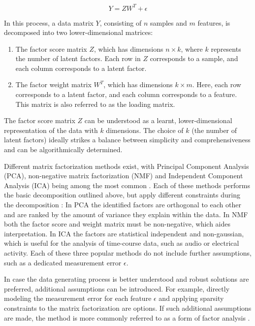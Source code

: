 \begin{flushleft}
\begin{equation}
    Y = ZW^T + \epsilon
\end{equation}

In this process, a data matrix \( Y \), consisting of \( n \) samples and \( m \) features, is decomposed into two lower-dimensional matrices: 

\begin{enumerate}
    \item The factor score matrix \( Z \), which has dimensions \( n \times k \), where \( k \) represents the number of latent factors. Each row in \( Z \) corresponds to a sample, and each column corresponds to a latent factor.
    \item The factor weight matrix \( W^T \), which has dimensions \( k \times m \). Here, each row corresponds to a latent factor, and each column corresponds to a feature. This matrix is also referred to as the loading matrix. 
\end{enumerate}

The factor score matrix \( Z \) can be understood as a learnt, lower-dimensional representation of the data with \( k \) dimensions. The choice of \( k \) (the number of latent factors) ideally strikes a balance between simplicity and comprehensiveness and can be algorithmically determined. 

Different matrix factorization methods exist, with Principal Component Analysis (PCA), non-negative matrix factorization (NMF) and Independent Component Analysis (ICA) being among the most common \citep{stein-obrienEnterMatrixFactorization2018}. Each of these methods performs the basic decomposition outlined above, but apply different constraints during the decomposition \citep{stein-obrienEnterMatrixFactorization2018}: In PCA the identified factors are orthogonal to each other and are ranked by the amount of variance they explain within the data. In NMF both the factor score and weight matrix must be non-negative, which aides interpretation. In ICA the factors are statistical independent and non-gaussian, which is useful for the analysis of time-course data, such as audio or electrical activity. Each of these three popular methods do not include further assumptions, such as a dedicated measurement error \(\epsilon\).

In case the data generating process is better understood and robust solutions are preferred, additional assumptions can be introduced. For example, directly modeling the measurement error for each feature \(\epsilon\) and applying sparsity constraints to the matrix factorization are options. If such additional assumptions are made, the method is more commonly referred to as a form of factor analysis \citep{klamiGroupFactorAnalysis2014}.



\end{flushleft}
